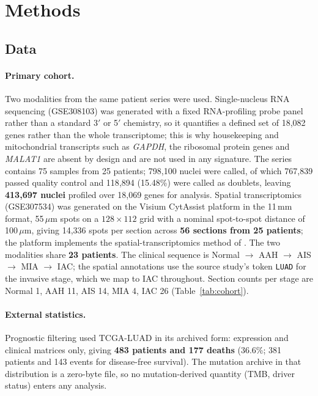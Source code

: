 \section{Methods}

\subsection{Data}

\paragraph{Primary cohort.} Two modalities from the same patient series were used.
Single-nucleus RNA sequencing (GSE308103) was generated with a fixed RNA-profiling probe
panel rather than a standard 3$'$ or 5$'$ chemistry, so it quantifies a defined set of
18{,}082 genes rather than the whole transcriptome; this is why housekeeping and
mitochondrial transcripts such as \emph{GAPDH}, the ribosomal protein genes and
\emph{MALAT1} are absent by design and are not used in any signature. The series contains
75 samples from 25 patients; 798{,}100 nuclei were called, of which 767{,}839 passed
quality control and 118{,}894 (15.48\%) were called as doublets, leaving
\textbf{413{,}697 nuclei} profiled over 18{,}069 genes for analysis.
Spatial transcriptomics (GSE307534) was generated on the Visium CytAssist platform in the
11\,mm format, 55\,$\mu$m spots on a $128\times112$ grid with a nominal spot-to-spot
distance of 100\,$\mu$m, giving 14{,}336 spots per section across \textbf{56 sections from
25 patients}; the platform implements the spatial-transcriptomics method of
\citet{stahl2016}. The two modalities share \textbf{23 patients}. The clinical sequence is
Normal $\rightarrow$ AAH $\rightarrow$ AIS $\rightarrow$ MIA $\rightarrow$ IAC; the spatial
annotations use the source study's token \texttt{LUAD} for the invasive stage, which we map
to IAC throughout. Section counts per stage are Normal 1, AAH 11, AIS 14, MIA 4, IAC 26
(Table~\ref{tab:cohort}).

\paragraph{External statistics.} Prognostic filtering used TCGA-LUAD
\citep{tcga2014luad} in its archived form: expression and clinical matrices only, giving
\textbf{483 patients and 177 deaths} (36.6\%; 381 patients and 143 events for disease-free
survival). The mutation archive in that distribution is a zero-byte file, so no
mutation-derived quantity (TMB, driver status) enters any analysis.

